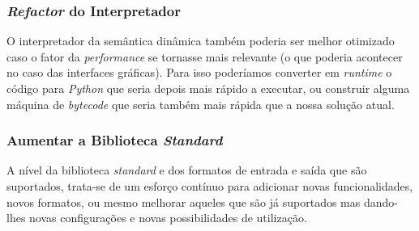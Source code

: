 \subsubsection*{\textit{Refactor} do Interpretador}
O interpretador da semântica dinâmica também poderia ser melhor otimizado caso o fator da \textit{performance} se tornasse mais relevante (o que poderia acontecer no caso das interfaces gráficas). Para isso poderíamos converter em \textit{runtime} o código para \textit{Python} que seria depois mais rápido a executar, ou construir alguma máquina de \textit{bytecode} que seria também mais rápida que a nossa solução atual.

\subsubsection*{Aumentar a Biblioteca \textit{Standard}}
A nível da biblioteca \textit{standard} e dos formatos de entrada e saída que são suportados, trata-se de um esforço contínuo para adicionar novas funcionalidades, novos formatos, ou mesmo melhorar aqueles que são já suportados mas dando-lhes novas configurações e novas possibilidades de utilização.
